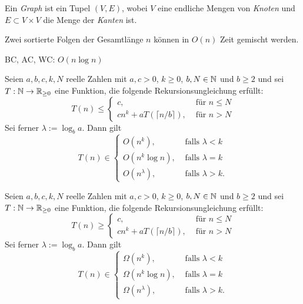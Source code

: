 \documentclass{cheat-sheet}
\begin{document}

\begin{defn}
  Ein \emph{Graph} ist ein Tupel $(V, E)$, wobei $V$ eine endliche Mengen von \emph{Knoten} und $E \subset V \times V$ die Menge der \emph{Kanten} ist.
\end{defn}




\begin{alg}
  Zwei sortierte Folgen der Gesamtlänge $n$ können in $O(n)$ Zeit gemischt werden.
\end{alg}

\begin{alg}[Mergesort]
  BC, AC, WC: $O(n \log n)$
\end{alg}


\begin{satz}
  Seien $a, b, c, k, N$ reelle Zahlen mit $a, c > 0$, $k \geq 0$, $b, N \in \mathbb{N}$ und $b \geq 2$ und sei $T : \mathbb{N} \to \mathbb{R}_{\geq 0}$ eine Funktion, die folgende Rekursionsungleichung erfüllt:
  \[ T(n) \leq \begin{cases}
    c, & \text{ für } n \leq N \\
    c n^k + a T(\lceil n / b \rceil), & \text{ für } n > N
  \end{cases} \]
  Sei ferner $\lambda := \log_b a$. Dann gilt
  \[ T(n) \in \begin{cases}
    O(n^k), & \text{ falls } \lambda < k \\
    O(n^k \log n), & \text{ falls } \lambda = k \\
    O(n^\lambda), & \text{ falls } \lambda > k.
  \end{cases} \]
\end{satz}

\begin{satz}
  Seien $a, b, c, k, N$ reelle Zahlen mit $a, c > 0$, $k \geq 0$, $b, N \in \mathbb{N}$ und $b \geq 2$ und sei $T : \mathbb{N} \to \mathbb{R}_{\geq 0}$ eine Funktion, die folgende Rekursionsungleichung erfüllt:
  \[ T(n) \geq \begin{cases}
    c, & \text{ für } n \leq N \\
    c n^k + a T(\lceil n / b \rceil), & \text{ für } n > N
  \end{cases} \]
  Sei ferner $\lambda := \log_b a$. Dann gilt
  \[ T(n) \in \begin{cases}
    \Omega(n^k), & \text{ falls } \lambda < k \\
    \Omega(n^k \log n), & \text{ falls } \lambda = k \\
    \Omega(n^\lambda), & \text{ falls } \lambda > k.
  \end{cases} \]
\end{satz}
\end{document}
